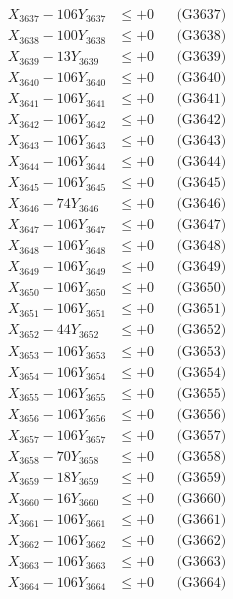 \documentclass[a4paper,10pt]{article}
\begin{document}
{\begin{align}
X_{3637} - 106Y_{3637} &\leq +0 && \text{(G3637)} \\
X_{3638} - 100Y_{3638} &\leq +0 && \text{(G3638)} \\
X_{3639} - 13Y_{3639} &\leq +0 && \text{(G3639)} \\
X_{3640} - 106Y_{3640} &\leq +0 && \text{(G3640)} \\
\allowbreak
X_{3641} - 106Y_{3641} &\leq +0 && \text{(G3641)} \\
X_{3642} - 106Y_{3642} &\leq +0 && \text{(G3642)} \\
X_{3643} - 106Y_{3643} &\leq +0 && \text{(G3643)} \\
X_{3644} - 106Y_{3644} &\leq +0 && \text{(G3644)} \\
X_{3645} - 106Y_{3645} &\leq +0 && \text{(G3645)} \\
X_{3646} - 74Y_{3646} &\leq +0 && \text{(G3646)} \\
X_{3647} - 106Y_{3647} &\leq +0 && \text{(G3647)} \\
X_{3648} - 106Y_{3648} &\leq +0 && \text{(G3648)} \\
X_{3649} - 106Y_{3649} &\leq +0 && \text{(G3649)} \\
X_{3650} - 106Y_{3650} &\leq +0 && \text{(G3650)} \\
\allowbreak
X_{3651} - 106Y_{3651} &\leq +0 && \text{(G3651)} \\
X_{3652} - 44Y_{3652} &\leq +0 && \text{(G3652)} \\
X_{3653} - 106Y_{3653} &\leq +0 && \text{(G3653)} \\
X_{3654} - 106Y_{3654} &\leq +0 && \text{(G3654)} \\
X_{3655} - 106Y_{3655} &\leq +0 && \text{(G3655)} \\
X_{3656} - 106Y_{3656} &\leq +0 && \text{(G3656)} \\
X_{3657} - 106Y_{3657} &\leq +0 && \text{(G3657)} \\
X_{3658} - 70Y_{3658} &\leq +0 && \text{(G3658)} \\
X_{3659} - 18Y_{3659} &\leq +0 && \text{(G3659)} \\
X_{3660} - 16Y_{3660} &\leq +0 && \text{(G3660)} \\
\allowbreak
X_{3661} - 106Y_{3661} &\leq +0 && \text{(G3661)} \\
X_{3662} - 106Y_{3662} &\leq +0 && \text{(G3662)} \\
X_{3663} - 106Y_{3663} &\leq +0 && \text{(G3663)} \\
X_{3664} - 106Y_{3664} &\leq +0 && \text{(G3664)} \\

\end{align}}
\end{document}
